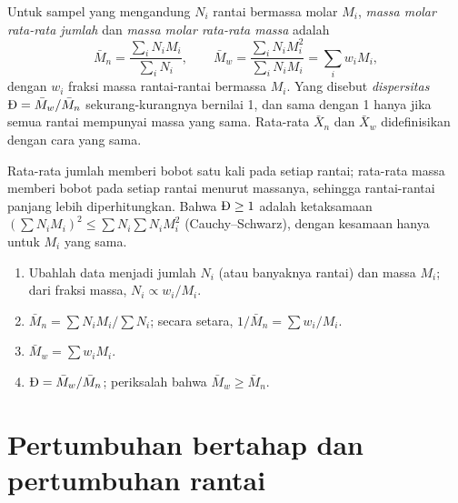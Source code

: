 \begin{definition}\label{def:b2:polymer-synthesis:averages}
Untuk sampel yang mengandung $N_i$ rantai bermassa molar $M_i$, \emph{massa
molar rata-rata jumlah} dan \emph{massa
molar rata-rata massa}
adalah
\begin{equation*}
\bar M_n = \frac{\sum_i N_i M_i}{\sum_i N_i}, \qquad
\bar M_w = \frac{\sum_i N_i M_i^2}{\sum_i N_i M_i} = \sum_i w_i M_i,
\end{equation*}
dengan $w_i$ fraksi massa rantai-rantai bermassa $M_i$. Yang disebut
\emph{dispersitas}
$\text{\DH} = \bar M_w/\bar M_n$ sekurang-kurangnya bernilai 1, dan sama
dengan 1 hanya jika semua rantai mempunyai massa yang sama. Rata-rata $\bar X_n$
dan $\bar X_w$  didefinisikan dengan cara yang sama.
\end{definition}

Rata-rata jumlah memberi bobot satu kali pada setiap rantai; rata-rata
massa memberi bobot pada setiap rantai menurut massanya, sehingga
rantai-rantai panjang lebih diperhitungkan. Bahwa $\text{\DH} \ge 1$ adalah
ketaksamaan $\left(\sum N_i M_i\right)^2 \le
\sum N_i \sum N_i M_i^2$ (Cauchy--Schwarz), dengan kesamaan hanya untuk $M_i$ yang sama.

\begin{method}\label{met:b2:polymer-synthesis:averages}
\begin{enumerate}
  \item Ubahlah data menjadi jumlah $N_i$ (atau banyaknya rantai) dan massa
        $M_i$; dari fraksi massa,
        $N_i \propto w_i/M_i$.
  \item $\bar M_n = \sum N_i M_i / \sum N_i$; secara setara, $1/\bar M_n = \sum w_i/M_i$.
  \item $\bar M_w = \sum w_i M_i$.
  \item $\text{\DH} = \bar M_w/\bar M_n$; periksalah bahwa $\bar M_w \ge \bar M_n$.
\end{enumerate}
\end{method}

\section{Pertumbuhan bertahap dan pertumbuhan rantai}


